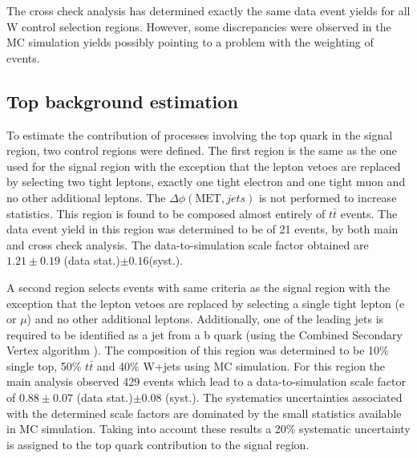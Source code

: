 The cross check analysis has determined exactly the same data event yields for all W control selection regions. However, some discrepancies were observed in the \gls{MC} simulation yields possibly pointing to a problem with the weighting of events.

\clearpage

\subsection{Top background estimation}
\label{SECTION:ParkedDataAnalysis_ControlRegions_TopBackground}


To estimate the contribution of processes involving the top quark in the signal region, two control regions were defined. The first region is the same as the one used for the signal region with the exception that the lepton vetoes are replaced by selecting two tight leptons, exactly one tight electron and one tight muon and no other additional leptons. The $\Delta\phi(\text{MET},jets)$ is not performed to increase statistics.  This region is found to be composed almost entirely of $t\bar{t}$ events. The data event yield in this region was determined to be of 21 events, by both main and cross check analysis. The data-to-simulation scale factor obtained are $1.21\pm 0.19$ (data stat.)$ \pm 0.16 $(syst.).

A second region selects events with same criteria as the signal region with the exception that the lepton vetoes are replaced by selecting a single tight lepton (e or $\mu$) and no other additional leptons. Additionally, one of the leading jets is required to be identified as a jet from a b quark (using the Combined Secondary Vertex algorithm \cite{ARTICLE:CMSIdentificationOfbQuarks}). The composition of this region was determined to be 10\% single top, 50\% $t\bar{t}$ and 40\% W+jets using \gls{MC} simulation. For this region the main analysis observed 429 events which lead to a data-to-simulation scale factor of $0.88\pm 0.07$ (data stat.)$ \pm 0.08$ (syst.). The systematics uncertainties associated with the determined scale factors are dominated by the small statistics available in \gls{MC} simulation. Taking into account these results a 20\% systematic uncertainty is assigned to the top quark contribution to the signal region. 

